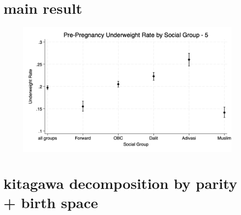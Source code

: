 \documentclass{article}
\begin{document}
\maketitle

\section{main result}

\begin{figure}[H]
    \centering
    \includegraphics[width=\textwidth]{figures/bootstrapped_underweight_by_group_5.png}
\end{figure}


\section{kitagawa decomposition by parity + birth space}



\end{document}
